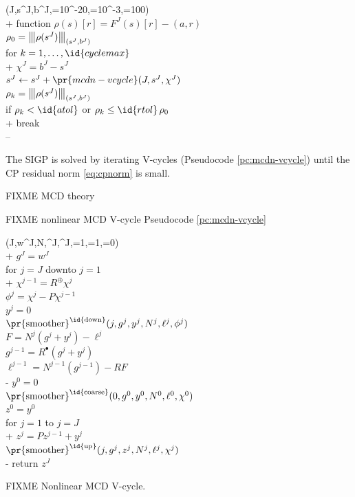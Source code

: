 \documentclass[letterpaper,final,12pt,reqno]{amsart}
\theoremstyle{claim}
\newcommand{\ip}[2]{\left(#1,#2\right)}
\newcommand{\mR}{R^{\bm{\oplus}}}
\newcommand{\iR}{R^{\bullet}}
\newcommand{\vertiii}[1]{{\left\vert\kern-0.25ex\left\vert\kern-0.25ex\left\vert #1 \right\vert\kern-0.25ex\right\vert\kern-0.25ex\right\vert}}
\numberwithin{equation}{section}
\numberwithin{figure}{section}
\numberwithin{table}{section}
\numberwithin{theorem}{section}
\begin{document}
\begin{pcode}[ht]
\begin{pseudo*}
(J,s^J,b^J,=10^{-20},=10^{-3},=100)\text{:} \\+
    function $\rho(s)[r] = F^J(s)[r] - \ip{a}{r}$ \qquad\qquad {} \\
    $\rho_0=\vertiii{\rho(s^J)}_{(s^J,b^J)}$ \\
    for $k=1,\dots,\id{cyclemax}$ \\+
        $\chi^J = b^J - s^J$ \qquad\qquad {} \\
        $s^J \gets s^J + \pr{mcdn-vcycle}(J,s^J,\chi^J)$ \\
        $\rho_k=\vertiii{\rho(s^J)}_{(s^J,b^J)}$ \\
        if $\rho_k < \id{atol}$ or $\rho_k \le \id{rtol} \, \rho_0$ \\+
            break \\--
\end{pseudo*}
\caption{The SIGP is solved by iterating V-cycles (Pseudocode \ref{pc:mcdn-vcycle}) until the CP residual norm \eqref{eq:cpnorm} is small.}
\label{pc:mcdn-solver}
\end{pcode}

FIXME MCD theory

FIXME nonlinear MCD V-cycle Pseudocode \ref{pc:mcdn-vcycle}

\begin{pcode}[ht]
\begin{pseudo*}
(J,w^J,N,\ell^J,\chi^J,=1,=1,=0)\text{:} \\+
    $g^J = w^J$ \\
    for $j=J$ downto $j=1$ \\+
      $\chi^{j-1} = \mR \chi^j$ \\
      $\phi^j = \chi^j - P\chi^{j-1}$ \\
      $y^j = 0$ \\
      $\text{\pr{smoother}}^{\text{\id{down}}}(j,g^j,y^j,N^j,\ell^j,\phi^j)$ \qquad {} \\
      $F = N^j(g^j+y^j) - \ell^j$ \\
      $g^{j-1} = \iR(g^j + y^j)$ \\
      $\ell^{j-1} = N^{j-1}(g^{j-1}) - R F$ \\-
    $y^0 = 0$ \\
    $\text{\pr{smoother}}^{\text{\id{coarse}}}(0,g^0,y^0,N^0,\ell^0,\chi^0)$ \\
    $z^0 = y^0$ \\
    for $j=1$ to $j=J$ \\+
      $z^j = P z^{j-1} + y^{j}$ \\
      $\text{\pr{smoother}}^{\text{\id{up}}}(j,g^j,z^j,N^j,\ell^j,\chi^j)$ \qquad {} \\-
    return $z^J$
\end{pseudo*}
\caption{FIXME Nonlinear MCD V-cycle.}
\label{pc:mcdn-vcycle}
\end{pcode}
\end{document}
